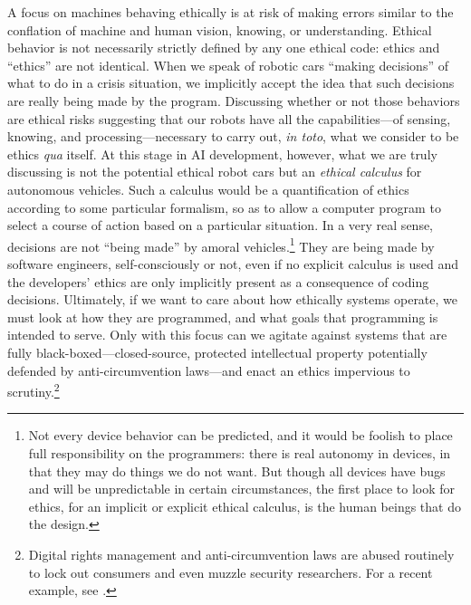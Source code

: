 A focus on machines behaving ethically is at risk of making errors
similar to the conflation of machine and human vision, knowing, or 
understanding. Ethical behavior is not necessarily strictly defined by
any one ethical code:  ethics and ``ethics'' are not identical. When we
speak of robotic cars ``making decisions'' of what to do in a crisis
situation, we implicitly accept the idea that such decisions are
really being made by the program. Discussing whether or not those
behaviors are ethical risks suggesting that our robots have all the
capabilities---of sensing, knowing, and processing---necessary to
carry out, \emph{in toto}, what we consider to be ethics \emph{qua} itself. At this
stage in AI development, however, what we are truly discussing is not
the potential ethical robot cars but an \emph{ethical calculus} for
autonomous vehicles. Such a calculus would be a quantification of
ethics according to some particular formalism, so as to allow a
computer program to select a course of action based on a particular
situation. In a very real sense, decisions are not
``being made'' by amoral vehicles.\footnote{Not every device behavior
can be predicted, and it would be foolish to place full responsibility
on the programmers: there is real autonomy in devices, in that they
may do things we do not want. But though all devices have bugs and
will be unpredictable in certain circumstances, the first place to
look for ethics, for an implicit or explicit ethical calculus, is the
human beings 
that do the design.} They are being made by software engineers,
self-consciously or not, even if no
explicit calculus is used and the developers' ethics are only
implicitly present as a consequence of coding decisions. Ultimately,
if we want to care about how ethically systems
operate, we must look at how they are programmed, and what goals that
programming is intended to serve. Only with this focus can we agitate
against systems that are fully black-boxed---closed-source, protected
intellectual property potentially defended by anti-circumvention
laws---and enact an ethics impervious to scrutiny.\footnote{Digital
  rights management and anti-circumvention laws are abused routinely
  to lock out consumers and even muzzle security researchers. For a
  recent example, see \cite{higgins}.
}



